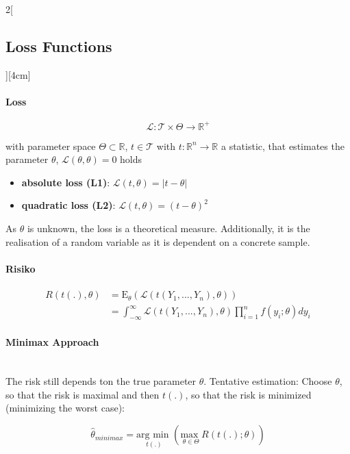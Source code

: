 \documentclass[8pt]{extarticle}
\begin{document}
\begin{multicols}{2}[\subsection{Loss Functions}][4cm]

\paragraph{Loss}

$$\mathcal{L}: \mathcal{T} \times \Theta \rightarrow \mathbb{R}^+$$

\noindent with parameter space $\Theta \subset \mathbb{R}$, $t\in \mathcal{T}$ with $t:\mathbb{R}^n \rightarrow \mathbb{R}$ a statistic, that estimates the parameter $\theta$,
 $\mathcal{L}(\theta, \theta) = 0$ holds

\begin{itemize}
\item \textbf{absolute loss (L1)}: $\mathcal{L}(t, \theta) = \left|t-\theta \right|$
\item \textbf{quadratic loss (L2)}: $\mathcal{L}(t, \theta) = (t-\theta)^2$
\end{itemize}

\noindent As $\theta$ is unknown, the loss is a theoretical measure. Additionally, it is the realisation of a random variable as it is dependent on a concrete sample.

\paragraph{Risiko}

\begin{align*}
R(t(.), \theta) &= \mathrm{E}_\theta \left(\mathcal{L}(t(Y_1,...,Y_n),\theta)\right) \\
&= \int_{-\infty}^\infty \mathcal{L}(t(Y_1,...,Y_n),\theta) \prod_{i=1}^n f(y_i;\theta)dy_i
\end{align*}

\paragraph{Minimax Approach} \ \\
\noindent The risk still depends ton the true parameter $\theta$.
Tentative estimation: Choose $\theta$, so that the risk is maximal and then $t(.)$, so that the risk is minimized (minimizing the worst case):

$$\hat{\theta}_{minimax} = \underset{t(.)}{\text{arg min }} \left(\underset{\theta \in \Theta}{\text{max }} R(t(.);\theta)\right)$$



\end{multicols}
\end{document}
